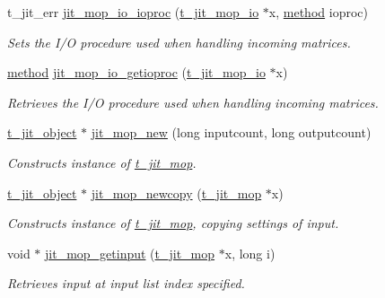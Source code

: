 \begin{DoxyCompactItemize}
t\_\-jit\_\-err \hyperlink{group__mopmod_gaeeb0806f2942f47b2eacb7b57331dfca}{jit\_\-mop\_\-io\_\-ioproc} (\hyperlink{structt__jit__mop__io}{t\_\-jit\_\-mop\_\-io} $\ast$x, \hyperlink{group__datatypes_gac26ba0a173b50597f5738132e059b42d}{method} ioproc)
\begin{DoxyCompactList}\small\item\em Sets the I/O procedure used when handling incoming matrices. \item\end{DoxyCompactList}\item 
\hyperlink{group__datatypes_gac26ba0a173b50597f5738132e059b42d}{method} \hyperlink{group__mopmod_gaad1d3da84eefe2cb691298be3800585f}{jit\_\-mop\_\-io\_\-getioproc} (\hyperlink{structt__jit__mop__io}{t\_\-jit\_\-mop\_\-io} $\ast$x)
\begin{DoxyCompactList}\small\item\em Retrieves the I/O procedure used when handling incoming matrices. \item\end{DoxyCompactList}\item 
\hyperlink{structt__object}{t\_\-jit\_\-object} $\ast$ \hyperlink{group__mopmod_ga0ae171d2c2adebf3f8ba5183e53cd763}{jit\_\-mop\_\-new} (long inputcount, long outputcount)
\begin{DoxyCompactList}\small\item\em Constructs instance of \hyperlink{structt__jit__mop}{t\_\-jit\_\-mop}. \item\end{DoxyCompactList}\item 
\hyperlink{structt__object}{t\_\-jit\_\-object} $\ast$ \hyperlink{group__mopmod_ga85a06757365f8f0d153a543d7f2734c8}{jit\_\-mop\_\-newcopy} (\hyperlink{structt__jit__mop}{t\_\-jit\_\-mop} $\ast$x)
\begin{DoxyCompactList}\small\item\em Constructs instance of \hyperlink{structt__jit__mop}{t\_\-jit\_\-mop}, copying settings of input. \item\end{DoxyCompactList}\item 
void $\ast$ \hyperlink{group__mopmod_ga75decd451d740e633331871410fea0c2}{jit\_\-mop\_\-getinput} (\hyperlink{structt__jit__mop}{t\_\-jit\_\-mop} $\ast$x, long i)
\begin{DoxyCompactList}\small\item\em Retrieves input at input list index specified. \item\end{DoxyCompactList}\item 

\end{DoxyCompactItemize}
